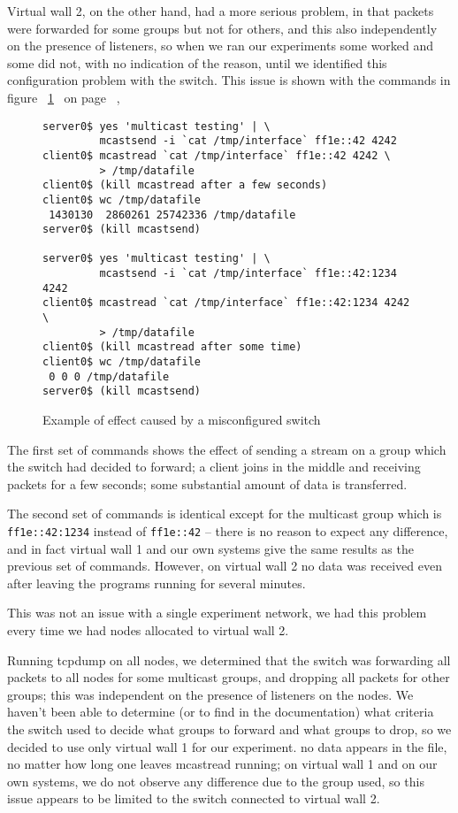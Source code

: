 \documentclass[a4paper,12pt]{article}
\newcommand{\pref}[1]{%
\ref{#1}%
\ifnum\thepage=0\pageref{#1}\else\ on page~\pageref{#1}\fi%
}
\begin{document}
Virtual wall 2, on the other hand, had a more serious problem, in
that packets were forwarded for some groups but not for others,
and this also independently on the presence of listeners, so when
we ran our experiments some worked and some did not, with no indication
of the reason, until we identified this configuration problem with
the switch. This issue is shown with the commands in figure~\pref{broken},
\begin{figure}[bp]
\begin{verbatim}
server0$ yes 'multicast testing' | \
         mcastsend -i `cat /tmp/interface` ff1e::42 4242
client0$ mcastread `cat /tmp/interface` ff1e::42 4242 \
         > /tmp/datafile
client0$ (kill mcastread after a few seconds)
client0$ wc /tmp/datafile
 1430130  2860261 25742336 /tmp/datafile
server0$ (kill mcastsend)

server0$ yes 'multicast testing' | \
         mcastsend -i `cat /tmp/interface` ff1e::42:1234 4242
client0$ mcastread `cat /tmp/interface` ff1e::42:1234 4242 \
         > /tmp/datafile
client0$ (kill mcastread after some time)
client0$ wc /tmp/datafile
 0 0 0 /tmp/datafile
server0$ (kill mcastsend)
\end{verbatim}
\caption{Example of effect caused by a misconfigured switch}
\label{broken}
\end{figure}

The first set of commands shows the effect of sending a stream on a
group which the switch had decided to forward; a client joins in the
middle and receiving packets for a few seconds; some substantial
amount of data is transferred.

The second set of commands is identical except for the multicast
group which is \verb+ff1e::42:1234+ instead of \verb+ff1e::42+ --
there is no reason to expect any difference, and in fact virtual wall
1 and our own systems give the same results as the previous set
of commands.  However, on virtual wall 2 no data was received
even after leaving the programs running for several minutes.

This was not an issue with a single experiment network, we had this
problem every time we had nodes allocated to virtual wall 2.

Running tcpdump on all nodes, we determined that the switch was
forwarding all packets to all nodes for some multicast groups,
and dropping all packets for other groups; this was independent
on the presence of listeners on the nodes.  We haven't been able
to determine (or to find in the documentation) what criteria the
switch used to decide what groups to forward and what groups to
drop, so we decided to use only virtual wall 1 for our experiment.
no data appears in the file, no matter how long one leaves mcastread
running; on virtual wall 1 and on our own systems, we do not observe
any difference due to the group used, so this issue appears to be
limited to the switch connected to virtual wall 2.
\end{document}
